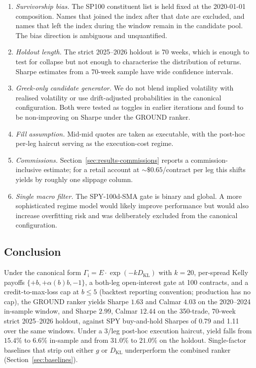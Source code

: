 \documentclass[11pt]{article}
\newcommand{\GROUND}{\Gamma_{\mathrm{i}}}
\begin{document}
\begin{enumerate}
    \item \emph{Survivorship bias.} The SP100 constituent list is held
        fixed at the 2020-01-01 composition. Names that joined the
        index after that date are excluded, and names that left the
        index during the window remain in the candidate pool. The
        bias direction is ambiguous and unquantified.
    \item \emph{Holdout length.} The strict 2025--2026 holdout is
        70 weeks, which is enough to test for collapse but not enough
        to characterise the distribution of returns. Sharpe estimates
        from a 70-week sample have wide confidence intervals.
    \item \emph{Greek-only candidate generator.} We do not blend
        implied volatility with realised volatility or use
        drift-adjusted probabilities in the canonical configuration.
        Both were tested as toggles in earlier iterations and found to
        be non-improving on Sharpe under the GROUND ranker.
    \item \emph{Fill assumption.} Mid-mid quotes are taken as
        executable, with the post-hoc per-leg haircut serving as the
        execution-cost regime.
    \item \emph{Commissions.} Section~\ref{sec:results-commissions}
        reports a commission-inclusive estimate; for a retail account
        at $\sim\$0.65$/contract per leg this shifts yields by roughly
        one slippage column.
    \item \emph{Single macro filter.} The SPY-100d-SMA gate is binary
        and global. A more sophisticated regime model would likely
        improve performance but would also increase overfitting risk
        and was deliberately excluded from the canonical configuration.
\end{enumerate}

\subsection{Conclusion}

Under the canonical form $\GROUND = E \cdot \exp(-k D_{\mathrm{KL}})$
with $k = 20$, per-spread Kelly payoffs $\{+b, +\alpha(b) b, -1\}$,
a both-leg open-interest gate at 100 contracts, and a
credit-to-max-loss cap at $b \le 5$ (backtest reporting convention; production has no cap), the GROUND ranker yields
Sharpe $1.63$ and Calmar $4.03$ on the 2020--2024 in-sample window,
and Sharpe $2.99$, Calmar $12.44$ on the 350-trade, 70-week strict
2025--2026 holdout, against SPY buy-and-hold Sharpes of 0.79 and 1.11
over the same windows. Under a 3\textcent/leg post-hoc execution
haircut, yield falls from $15.4\%$ to $6.6\%$ in-sample and from
$31.0\%$ to $21.0\%$ on the holdout. Single-factor baselines that
strip out either $g$ or $D_{\mathrm{KL}}$ underperform the combined
ranker (Section~\ref{sec:baselines}).
\end{document}
